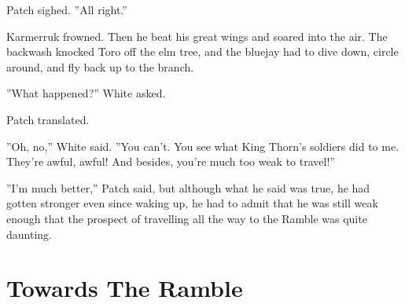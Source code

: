 \documentclass[12pt]{book}
\begin{document}
 Patch sighed. ''All right.''\par
 Karmerruk frowned. Then he beat his great wings and soared into the air. The backwash knocked Toro off the elm tree, and the bluejay had to dive down, circle around, and fly back up to the branch.\par
 ''What happened?'' White asked.\par
 Patch translated.\par
 ''Oh, no,'' White said. ''You can't. You see what King Thorn's soldiers did to me. They're awful, awful! And besides, you're much too weak to travel!''\par
 ''I'm much better,'' Patch said, but although what he said was true, he had gotten stronger even since waking up, he had to admit that he was still weak enough that the prospect of travelling all the way to the Ramble was quite daunting.\par

\section{Towards The Ramble}
\end{document}
